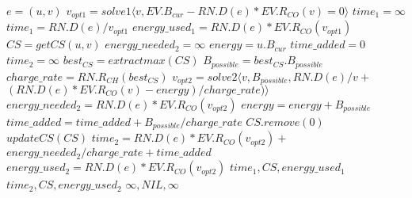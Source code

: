 \begin{algorithmic}
	\State $e = (u, v)$
	\State $v_{opt1} = solve1\langle v, EV.B_{cur}-RN.D(e)*EV.R_{CO}(v) = 0\rangle$
		\State $time_1 = \infty$
	\Else
		\State $time_1 = RN.D(e) / v_{opt1}$
		\State $energy\_used_{1} = RN.D(e)*EV.R_{CO}(v_{opt1})$
	\EndIf
		\State $CS = getCS(u, v)$ 
		\State $energy\_needed_{2} = \infty$
		\State $energy = u.B_{cur}$
		\State $time\_added = 0$
		\State $time_2 = \infty$
		\State $best_{CS} = extractmax(CS)$
		\State $B_{possible} = best_{CS}.B_{possible}$
		\State $charge\_rate = RN.R_{CH}(best_{CS})$
		\State $v_{opt2} = solve2 \langle v, B_{possible},  RN.D(e)/v + $
			\State $(RN.D(e)*EV.R_{CO}(v)-energy)/charge\_rate) \rangle$
		\State $energy\_needed_{2} = RN.D(e)*EV.R_{CO}(v_{opt2})$
		\State $energy = energy + B_{possible}$
			\State $time\_added = time\_added + B_{possible}/charge\_rate$
			\State $CS.remove(0)$
			\State $updateCS(CS)$
		\EndIf	
	\EndWhile
		\State $time_2 = RN.D(e)*EV.R_{CO}(v_{opt2}) + $
		\State $energy\_needed_{2}/charge\_rate + time\_added$
		\State $energy\_used_2 = RN.D(e)*EV.R_{CO}(v_{opt2})$
	\EndIf
		\State \Return $time_1, CS, energy\_used_1$
		\State \Return $time_2, CS, energy\_used_2$
	\Else
		\State \Return $\infty, NIL, \infty$
	\EndIf

\EndFunction
\end{algorithmic}\label{alg:fastest_path}








